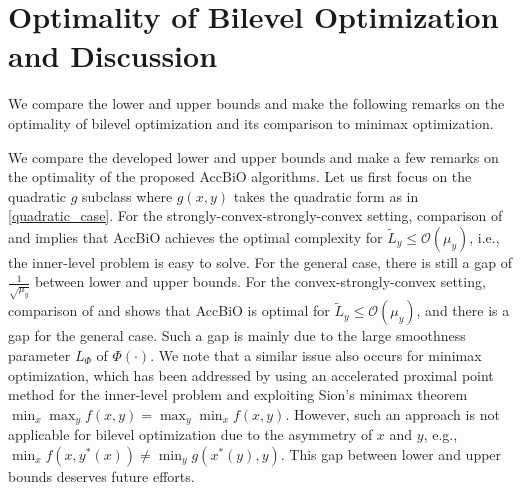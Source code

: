 \documentclass{osudissert96}
\begin{document}
\section{Optimality of Bilevel Optimization and Discussion}
We compare the lower and upper bounds and make the following remarks on the optimality of bilevel optimization and its comparison to minimax optimization. 

\vspace{0.3cm}
 We compare the developed lower and upper bounds and make a few remarks on the optimality of the proposed AccBiO algorithms. Let us first focus on the quadratic $g$ subclass where $g(x,y)$ takes the quadratic form as in \cref{quadratic_case}. For the strongly-convex-strongly-convex setting, comparison of  and  implies that AccBiO achieves the optimal complexity for $\widetilde L_y\leq \mathcal{O}(\mu_y)$, i.e., the inner-level problem is easy to solve.  For the general case, there is still a gap of $\frac{1}{\sqrt{\mu_y}}$ between lower and upper bounds.  For the convex-strongly-convex setting, comparison of  and  shows that AccBiO is optimal for $\widetilde L_y\leq \mathcal{O}(\mu_y)$, and there is a gap for the general case. Such a gap is mainly due to the large smoothness parameter $L_\Phi$ of $\Phi(\cdot)$. We note that a similar issue also occurs for minimax optimization, which has been addressed by \cite{lin2020near} using an accelerated proximal point method for the inner-level problem and exploiting Sion's minimax theorem $\min_x\max_y f(x,y) =\max_y\min_x f(x,y)$. However, such an approach is not applicable for bilevel optimization due to the asymmetry of $x$ and $y$, e.g., $\min_xf(x,y^*(x)) \neq \min_y g(x^*(y),y)$. This gap between lower and upper bounds deserves future efforts.
\end{document}
